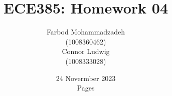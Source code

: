 \documentclass{article}
\title{ECE385: Homework 04}
\author{Farbod Mohammadzadeh\\
    (1008360462)\\
    Connor Ludwig\\
    (1008333028)\\}
\date{24 Novermber 2023\\ \pageref{LastPage} Pages}
\begin{document}
\Large
\maketitle
\newpage

\newpage

\newpage

\newpage

\newpage

\end{document}
